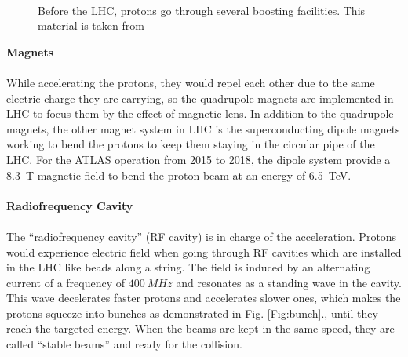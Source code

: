 \\
\begin{figure}[!h]                
	\centering
	\begin{center}
		\caption{Before the LHC, protons go through several boosting facilities. This material is taken from \cite{Mobs:2197559}}
		\label{Fig:boost}            
	\end{center}
\end{figure}
{\bf Magnets}
\\
\\While accelerating the protons, they  would repel each other due to the same electric charge they are carrying, so the quadrupole magnets are implemented in LHC to focus them by the effect of magnetic lens. In addition to the quadrupole magnets, the other magnet system in LHC is the superconducting dipole magnets working to bend the protons to keep them staying in the circular pipe of the LHC. For the ATLAS operation from 2015 to 2018, the dipole system provide a 8.3~T magnetic field to bend the proton beam at an energy of 6.5~TeV.
\\
\\{\bf Radiofrequency Cavity\cite{Radiofrequency:1997424}}  
\\
\\The ``radiofrequency cavity'' (RF cavity) is in charge of the acceleration. Protons would experience electric field when going through RF cavities which are installed in the LHC like beads along a string. The field is induced by an alternating current of a frequency of $400~MHz$ and resonates as a standing wave in the cavity. This wave decelerates faster protons and accelerates slower ones, which makes the protons squeeze into bunches as demonstrated in Fig. \ref{Fig:bunch}., until they reach the targeted energy. When the beams are kept in the same speed, they are called ``stable beams'' and ready for the collision. 
